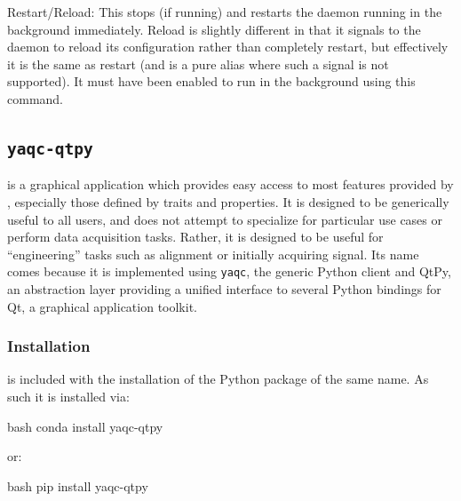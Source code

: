 Restart/Reload: This stops (if running) and restarts the daemon running
in the background immediately. Reload is slightly different in that it
signals to the daemon to reload its configuration rather than completely
restart, but effectively it is the same as restart (and is a pure alias
where such a signal is not supported). It must have been enabled to run
in the background using this command.




\subsection{\texttt{yaqc-qtpy}}

\yaqcqtpy{} is a graphical application which provides easy access to most features provided by \yaq{}, especially those defined by traits and properties.
It is designed to be generically useful to all \yaq{} users, and does not attempt to specialize for particular use cases or perform data acquisition tasks.
Rather, it is designed to be useful for ``engineering'' tasks such as alignment or initially acquiring signal.
Its name comes because it is implemented using \texttt{yaqc}\cite{yaqc}, the generic Python \yaq{} client and QtPy\cite{QtPy}, an abstraction layer providing a unified interface to several Python bindings for Qt\cite{Qt}, a graphical application toolkit.

\subsubsection{Installation}

 
\yaqcqtpy{} is included with the installation of the Python package of the same name.
As such it is installed via:
 
\begin{codefragment}{bash}
conda install yaqc-qtpy
\end{codefragment}
 
or:                                                                                                                  
 
\begin{codefragment}{bash}
pip install yaqc-qtpy
\end{codefragment}

